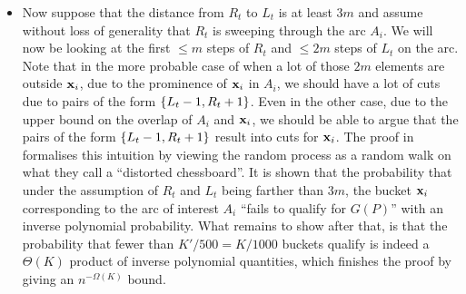 \begin{itemize}
\item Now suppose that the distance from $R_t$ to $L_t$ is at least $3m$ and assume without loss of generality that $R_t$ is sweeping through the arc $A_i$. We will now be looking at the first $\leq m$ steps of $R_t$ and $\leq 2m$ steps of $L_t$ on the arc. Note that in the more probable case of when a lot of those $2m$ elements are outside $\mathbf{x}_i$, due to the prominence of $\mathbf{x}_i$ in $A_i$, we should have a lot of cuts due to pairs of the form $\left\{L_t - 1, R_t + 1\right\}$. Even in the other case, due to the upper bound on the overlap of $A_i$ and $\mathbf{x}_i$, we should be able to argue that the pairs of the form $\left\{L_t - 1, R_t + 1\right\}$ result into cuts for $\mathbf{x}_i$. The proof in \cite{dmpy12} formalises this intuition by viewing the random process as a random walk on what they call a ``distorted chessboard''. It is shown that the probability that under the assumption of $R_t$ and $L_t$ being farther than $3m$, the bucket $\mathbf{x}_i$ corresponding to the arc of interest $A_i$ ``fails to qualify for $G(P)$'' with an inverse polynomial probability. What remains to show after that, is that the probability that fewer than $K'/500 = K/1000$ buckets qualify is indeed a $\Theta(K)$ product of inverse polynomial quantities, which finishes the proof by giving an $n^{-\Omega(K)}$ bound.
\end{itemize}


